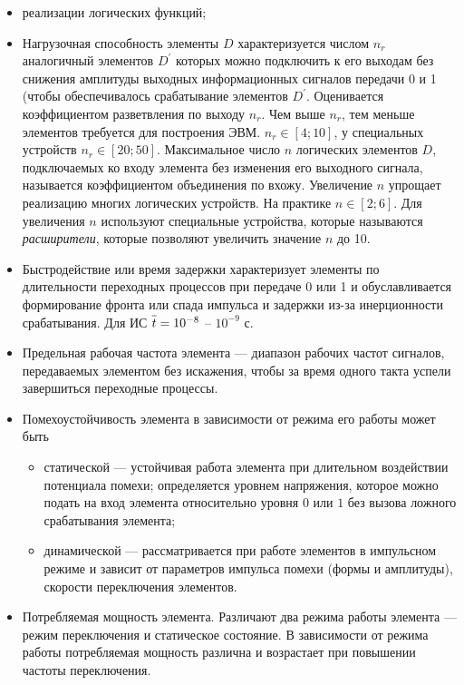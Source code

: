 \documentclass[10pt,a4paper,titlepage]{article}
\begin{document}
\begin{itemize}
\item реализации логических функций;
\item Нагрузочная способность элементы $D$ характеризуется числом $n_r$ аналогичный элементов $D^\prime$ которых можно подключить к его выходам без снижения амплитуды выходных информационных сигналов передачи 0 и 1 (чтобы обеспечивалось срабатывание элементов $D^\prime$.
Оценивается коэффициентом разветвления по выходу $n_r$.
Чем выше $n_r$, тем меньше элементов требуется для построения ЭВМ. $n_r \in [4;10]$, у специальных устройств $n_r \in [20;50]$.
Максимальное число $n$ логических элементов $D$, подключаемых ко входу элемента без изменения его выходного сигнала, называется коэффициентом объединения по вхожу.
Увеличение $n$ упрощает реализацию многих логических устройств.
На практике $n \in [2;6]$.
Для увеличения $n$ используют специальные устройства, которые называются \textit{расширители}, которые позволяют увеличить значение $n$ до 10.
\item Быстродействие или время задержки характеризует элементы по длительности переходных процессов при передаче 0 или 1 и обуславливается формирование фронта или спада импульса и задержки из-за инерционности срабатывания.
Для ИС $\overline{\mathstrut t} = 10^{-8}$ -- $10^{-9}$ с.
\item Предельная рабочая частота элемента --- диапазон рабочих частот сигналов, передаваемых элементом без искажения, чтобы за время одного такта успели завершиться переходные процессы.
\item Помехоустойчивость элемента в зависимости от режима его работы может быть
\begin{itemize}
\item статической --- устойчивая работа элемента при длительном воздействии потенциала помехи; определяется уровнем напряжения, которое можно подать на вход элемента относительно уровня $0$ или $1$ без вызова ложного срабатывания элемента;
\item динамической --- рассматривается при работе элементов в импульсном режиме и зависит от параметров импульса помехи (формы и амплитуды), скорости переключения элементов.
\end{itemize}
\item Потребляемая мощность элемента.
Различают два режима работы элемента --- режим переключения и статическое состояние.
В зависимости от режима работы потребляемая мощность различна и возрастает при повышении частоты переключения.
\end{itemize}
\end{document}
